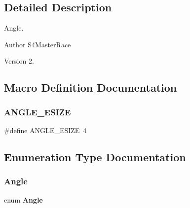 \subsection{Detailed Description}
Angle. 

\begin{DoxyAuthor}{Author}
S4\+Master\+Race 
\end{DoxyAuthor}
\begin{DoxyVersion}{Version}
2. 
\end{DoxyVersion}


\subsection{Macro Definition Documentation}
\mbox{\label{angle_8h_ac2a4e92ac8bd9e08ab1aace9b8cc4882}} 
\subsubsection{A\+N\+G\+L\+E\+\_\+\+E\+S\+I\+ZE}
{\footnotesize\ttfamily \#define A\+N\+G\+L\+E\+\_\+\+E\+S\+I\+ZE~4}



\subsection{Enumeration Type Documentation}
\mbox{\label{angle_8h_a0200d2d1b3a7930d0be6c50e7c8ae7d1}} 
\subsubsection{Angle}
{\footnotesize\ttfamily enum \textbf{ Angle}}

